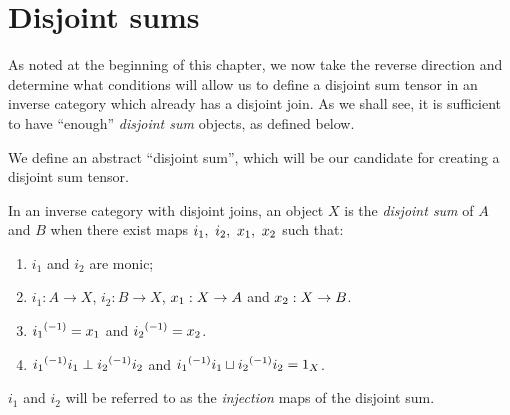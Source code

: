 \section{Disjoint sums} %
\label{sub:disjoint_sums}

As noted at the beginning of this chapter, we now take the reverse direction and determine what
conditions will allow us to define a disjoint sum tensor in an inverse category which already has a
disjoint join. As we shall see, it is sufficient to have ``enough'' \emph{disjoint sum} objects, as
defined below.


We define an abstract ``disjoint sum'', which will be our candidate for creating a disjoint sum
tensor.
\begin{definition}\label{def:disjoint_sum}
  In an inverse category with disjoint joins, an object $X$ is the \emph{disjoint sum} of $A$ and
  $B$ when there exist maps $i_1,\ i_2,\ \xa,\ \xb$ such that:
  \begin{enumerate}[{(}i{)}]
    \item $i_1$ and $i_2$ are monic;
    \item $i_1 : A \to X$, $i_2: B \to X$, $x_1: X \to A$ and $x_2: X \to B$.
    \item ${i_1}^{(-1)} = x_1$ and ${i_2}^{(-1)} = x_2$.
    \item ${i_1}^{(-1)}i_1 \perp {i_2}^{(-1)}i_2$ and ${i_1}^{(-1)}i_1 \sqcup {i_2}^{(-1)}i_2 = 1_X$.
  \end{enumerate}
  $i_1$ and $i_2$ will be referred to as the \emph{injection} maps of the disjoint sum.
\end{definition}

